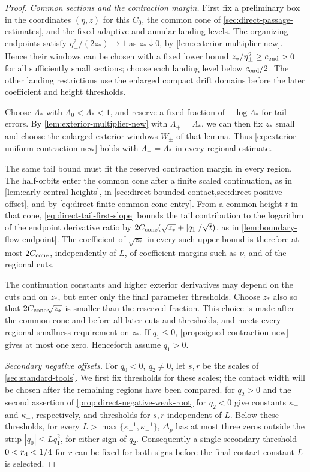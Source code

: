 \begin{proof}
\emph{Common sections and the contraction margin.}
First fix a preliminary box in the coordinates \((\eta,z)\) for this
\(C_0\), the common cone of \cref{sec:direct-passage-estimates}, and the
fixed adaptive and annular landing levels. The organizing endpoints satisfy
\(\eta_\pm^2/(2z_*)\to1\) as \(z_*\downarrow0\), by
\cref{lem:exterior-multiplier-new}. Hence their windows can be
chosen with a fixed lower bound \(z_*/\eta_\pm^2\ge c_{\rm end}>0\)
for all sufficiently small sections; choose each landing level
below \(c_{\rm end}/2\). The other landing restrictions use the enlarged
compact drift domains before the later coefficient and height thresholds.

Choose \(\Lambda_*\) with \(\Lambda_0<\Lambda_*<1\), and reserve a
fixed fraction of \(-\log\Lambda_*\) for tail errors.
By \cref{lem:exterior-multiplier-new} with \(\Lambda_+=\Lambda_*\),
we can then fix \(z_*\) small and choose the enlarged exterior
windows \(\widetilde W_\pm\) of that lemma. Thus
\eqref{eq:exterior-uniform-contraction-new} holds with
\(\Lambda_+=\Lambda_*\) in every regional estimate.

The same tail bound must fit the reserved contraction margin in every
region. The half-orbits enter the common cone after a finite scaled
continuation, as in \cref{lem:early-central-heights},
in \cref{sec:direct-bounded-contact,sec:direct-positive-offset}, and
by \eqref{eq:direct-finite-common-cone-entry}. From a common height
\(t\) in that cone, \eqref{eq:direct-tail-first-slope} bounds the
tail contribution to the logarithm of the endpoint derivative ratio by
\(2C_{\rm cone}(\sqrt{z_*}+|q_1|/\sqrt t)\), as in
\cref{lem:boundary-flow-endpoint}. The coefficient of \(\sqrt{z_*}\)
in every such upper bound is therefore at most \(2C_{\rm cone}\),
independently of \(L\), of coefficient margins such as \(\nu\), and
of the regional cuts.

The continuation constants and higher exterior derivatives may depend
on the cuts and on \(z_*\), but enter only the final parameter
thresholds. Choose \(z_*\) also so that
\(2C_{\rm cone}\sqrt{z_*}\) is smaller than the reserved fraction.
This choice is made after the common cone and before all later cuts
and thresholds, and meets every regional smallness requirement on
\(z_*\). If \(q_1\le0\), \cref{prop:signed-contraction-new} gives
at most one zero. Henceforth assume \(q_1>0\).

\emph{Secondary negative offsets.}
For \(q_0<0,\ q_2\ne0\), let \(s,r\) be the scales of
\cref{sec:standard-tools}. We first fix thresholds for these scales;
the contact width will be chosen after the remaining regions have
been compared.
 for \(q_2>0\) and the second
assertion of \cref{prop:direct-negative-weak-root} for \(q_2<0\) give
constants \(\kappa_+\) and \(\kappa_-\), respectively, and thresholds for
\(s,r\) independent of \(L\). Below these thresholds, for every
\(L>\max\{\kappa_+^{-1},\kappa_-^{-1}\}\), \(\Delta_p\) has at most three
zeros outside the strip \(|q_0|\le Lq_1^2\), for either sign of \(q_2\).
Consequently a single secondary threshold
\(0<r_{\rm d}<1/4\) for \(r\) can be fixed for both signs
before the final contact constant \(L\) is selected.


\end{proof}
